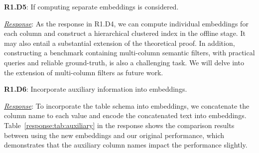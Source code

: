 \documentclass[sigconf]{acmart}
\begin{document}


{\noindent \textbf{R1.D5}}:  If computing separate embeddings is considered.


{\noindent \underline{\sl Response}:}
As the response in R1.D4, we can compute individual embeddings for each column and construct a hierarchical clustered index in the offline stage. It may also entail a substantial extension of the theoretical proof. 
In addition, constructing a benchmark containing multi-column semantic filters, with practical queries and reliable ground-truth, is also a challenging task. We will delve into the extension of multi-column filters as future work.



{\noindent \textbf{R1.D6}}: Incorporate auxiliary information into embeddings. 

{\noindent \underline{\sl Response}:}
To incorporate the table schema into embeddings, we concatenate the column name to each value and encode the concatenated text into embeddings.
Table~\ref{response:tab:auxiliary} in the response shows the comparison results between using the new embeddings and our original performance, which demonstrates that the auxiliary column names impact the performance slightly. 
\end{document}
